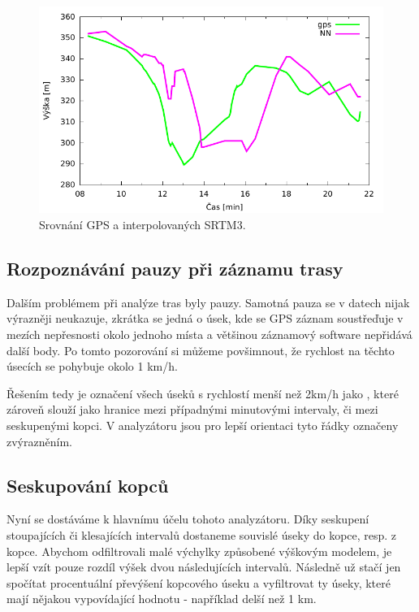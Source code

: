 \documentclass[thesis=B,czech]{FITthesis}[2012/06/26]
\begin{document}
 \begin{figure}[p]\centering
 	\includegraphics[page=2]{grafy/porovnani.pdf}
 	\caption{Srovnání GPS a interpolovaných SRTM3.}
 	\label{img:gpsporovnaniok}
 	
 \end{figure}



\subsection{Rozpoznávání pauzy při záznamu trasy}
Dalším problémem při analýze tras byly pauzy. Samotná pauza se v datech nijak výrazněji neukazuje, zkrátka se jedná o úsek, kde se GPS záznam soustřeďuje v mezích nepřesnosti okolo jednoho místa a většinou záznamový software nepřidává další body. Po tomto pozorování si můžeme povšimnout, že rychlost na těchto  úsecích se pohybuje okolo 1 km/h. 

Řešením tedy je označení všech úseků s rychlostí menší než 2km/h jako , které zároveň slouží jako hranice mezi případnými minutovými intervaly, či mezi seskupenými kopci. V analyzátoru jsou pro lepší orientaci tyto řádky označeny zvýrazněním.

\subsection{Seskupování kopců}
Nyní se dostáváme k hlavnímu účelu tohoto analyzátoru. Díky seskupení stoupajících či klesajících intervalů dostaneme souvislé úseky do kopce, resp. z kopce. Abychom odfiltrovali malé výchylky způsobené výškovým modelem, je lepší vzít pouze rozdíl výšek dvou následujících intervalů. Následně už stačí jen spočítat procentuální převýšení kopcového úseku a vyfiltrovat ty úseky, které mají nějakou vypovídající hodnotu - například delší než 1 km.
\end{document}
